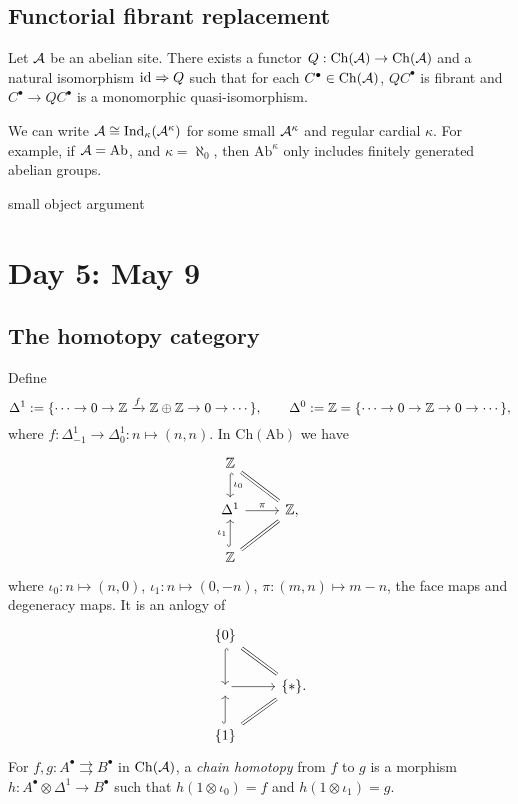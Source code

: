 \documentclass{../../../small}
\begin{document}
\subsection{Functorial fibrant replacement}
\begin{thm*}
Let $\mathcal{A}$ be an abelian site.
There exists a functor $Q:\mathrm{Ch}(\mathcal{A})\to\mathrm{Ch}(\mathcal{A})$ and a natural isomorphism $\operatorname{id}\Rightarrow Q$ such that for each $C^\bullet\in\mathrm{Ch}(\mathcal{A})$, $QC^\bullet$ is fibrant and $C^\bullet\to QC^\bullet$ is a monomorphic quasi-isomorphism.
\end{thm*}



We can write $\mathcal{A}\cong\mathrm{Ind}_\kappa(\mathcal{A}^\kappa)$ for some small $\mathcal{A}^\kappa$ and regular cardial $\kappa$.
For example, if $\mathcal{A}=\mathrm{Ab}$, and $\kappa=\aleph_0$, then $\mathrm{Ab}^\kappa$ only includes finitely generated abelian groups.

small object argument




\newpage
\section{Day 5: May 9}

\subsection{The homotopy category}
Define
\[\Delta^1:=\{\cdots\to0\to\mathbb{Z}\xrightarrow{f}\mathbb{Z}\oplus\mathbb{Z}\to0\to\cdots\},\qquad\Delta^0:=\mathbb{Z}=\{\cdots\to0\to\mathbb{Z}\to0\to\cdots\},\]
where $f:\Delta^1_{-1}\to\Delta^1_0:n\mapsto(n,n)$.
In $\mathrm{Ch}(\mathrm{Ab})$ we have
\[\begin{tikzcd}
\Z \dar[hook]{\iota_0} & \\
\Delta^1 \rar{\pi} & \Z \ar[equal]{lu}\ar[equal]{ld}, \\
\Z \uar[hook]{\iota_1} &
\end{tikzcd}\]
where $\iota_0:n\mapsto(n,0)$, $\iota_1:n\mapsto(0,-n)$, $\pi:(m,n)\mapsto m-n$, the face maps and degeneracy maps.
It is an anlogy of
\[\begin{tikzcd}
\{0\}\dar[hook] & \\
[0,1] \rar & \{*\} \ar[equal]{lu}\ar[equal]{ld}. \\
\{1\} \uar[hook] &
\end{tikzcd}\]
For $f,g:A^\bullet\rightrightarrows B^\bullet$ in $\mathrm{Ch}(\mathcal{A})$, a \emph{chain homotopy} from $f$ to $g$ is a morphism $h:A^\bullet\otimes\Delta^1\to B^\bullet$ such that $h(1\otimes\iota_0)=f$ and $h(1\otimes\iota_1)=g$.
\end{document}
